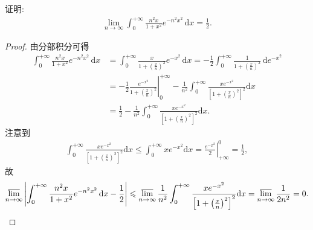 \documentclass[../../main.tex]{subfiles}
\begin{document}
\begin{example}
证明:
\begin{align*}
\lim_{n \to \infty} \int_0^{+\infty} \frac{n^2 x}{1 + x^2} e^{-n^2 x^2} \, \mathrm{d}x = \frac{1}{2}.
\end{align*}
\end{example}
\begin{proof}
由分部积分可得
\begin{align*}
\int_0^{+\infty} \frac{n^2 x}{1 + x^2} e^{-n^2 x^2} \, \mathrm{d}x &= \int_0^{+\infty} \frac{x}{1 + \left( \frac{x}{n} \right)^2} e^{-x^2} \, \mathrm{d}x = -\frac{1}{2} \int_0^{+\infty} \frac{1}{1 + \left( \frac{x}{n} \right)^2} \, \mathrm{d}e^{-x^2} \\
&= -\frac{1}{2} \left. \frac{e^{-x^2}}{1 + \left( \frac{x}{n} \right)^2} \right|_0^{+\infty} - \frac{1}{n^2} \int_0^{+\infty} \frac{x e^{-x^2}}{\left[ 1 + \left( \frac{x}{n} \right)^2 \right]^2} \mathrm{d}x \\
&= \frac{1}{2} - \frac{1}{n^2} \int_0^{+\infty} \frac{x e^{-x^2}}{\left[ 1 + \left( \frac{x}{n} \right)^2 \right]^2} \mathrm{d}x.
\end{align*}
注意到
\begin{align*}
\int_0^{+\infty} \frac{x e^{-x^2}}{\left[ 1 + \left( \frac{x}{n} \right)^2 \right]^2} \mathrm{d}x \leqslant \int_0^{+\infty} x e^{-x^2} \mathrm{d}x = \left. \frac{e^{-x^2}}{2} \right|_{+\infty}^0 = \frac{1}{2},
\end{align*}
故
\begin{align*}
\varlimsup_{n \to \infty} \left| \int_0^{+\infty} \frac{n^2 x}{1 + x^2} e^{-n^2 x^2} \, \mathrm{d}x - \frac{1}{2} \right| \leqslant \varlimsup_{n \to \infty} \frac{1}{n^2} \int_0^{+\infty} \frac{x e^{-x^2}}{\left[ 1 + \left( \frac{x}{n} \right)^2 \right]^2} \mathrm{d}x = \varlimsup_{n \to \infty} \frac{1}{2n^2} = 0.
\end{align*}
\end{proof}
\end{document}
